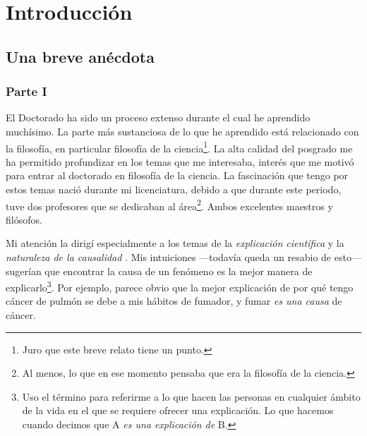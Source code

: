 
\chapter*{Introducción}\label{ch:introduction}

\section*{Una breve anécdota}

\subsection{Parte I}

\noindent El Doctorado ha sido un proceso extenso durante el cual he aprendido muchísimo. La parte más sustanciosa de lo que he aprendido está relacionado con la filosofía, en particular filosofía de la ciencia\footnote{Juro que este breve relato tiene un punto.}.  La alta calidad del posgrado me ha permitido profundizar en los temas  que me interesaba, interés que me motivó para entrar al doctorado en filosofía de la ciencia.  La fascinación que tengo por estos temas nació durante mi  licenciatura, debido a que durante este periodo, tuve dos profesores  que se dedicaban al área\footnote{Al menos, lo que en ese momento pensaba que era la filosofía de la ciencia.}. Ambos excelentes maestros y filósofos.

Mi atención la dirigí especialmente a los temas de la \emph
{explicación científica} y la \emph{naturaleza de la causalidad }.
Mis intuiciones ---todavía queda un resabio de esto--- sugerían que
encontrar la causa de un fenómeno es la mejor manera de
explicarlo\footnote{ Uso el término para referirme a lo que hacen las
 personas en cualquier ámbito de la vida en el que se requiere ofrecer
 una explicación. Lo que hacemos cuando decimos que A \emph{es una
  explicación de} B. }. Por ejemplo, parece obvio que la mejor
explicación de por qué tengo cáncer de pulmón se debe a mis hábitos
de fumador, y fumar \emph{es una causa} de cáncer.

